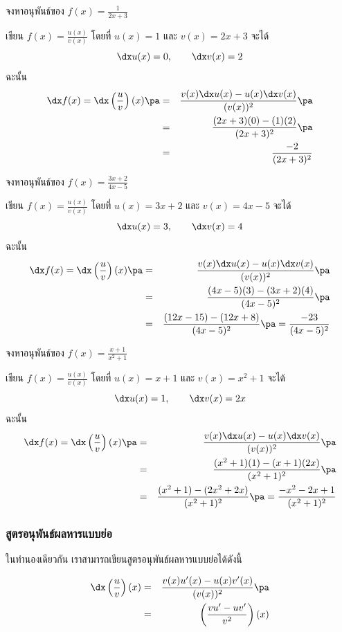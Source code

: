 \begin{frame}[t]
\begin{ex}
จงหาอนุพันธ์ของ $f(x) =\frac{1}{2x+3}$
\end{ex} \pa
\begin{sol}
เขียน $f(x) = \frac{u(x)}{v(x)}$ โดยที่ $u(x) = 1$ และ $v(x) = 2x+3$ \pa จะได้ 
\[\dx u(x) = 0, \qquad \dx v(x) = 2\] 
ฉะนั้น
\begin{eqnarray*}
\dx f(x) = \dx \left( \frac{u}{v}\right)(x) \pa &=& \frac{v(x)\dx u(x) - u(x)\dx v(x)}{(v(x))^2}\pa \\
&=& \frac{(2x+3)(0) - (1)(2)}{(2x+3)^2}\pa \\
&=& \frac{-2}{(2x+3)^2}
\end{eqnarray*}
\end{sol}
\end{frame}


\begin{frame}[t]
\begin{ex}
จงหาอนุพันธ์ของ $f(x) =\frac{3x+2}{4x-5}$
\end{ex}
\begin{sol}
เขียน $f(x) = \frac{u(x)}{v(x)}$ โดยที่ $u(x) = 3x+2$ และ $v(x) = 4x-5$ \pa จะได้ 
\[\dx u(x) = 3, \qquad \dx v(x) = 4\]
\pa ฉะนั้น
\begin{eqnarray*}
\dx f(x) = \dx \left( \frac{u}{v}\right)(x) \pa &=& \frac{v(x)\dx u(x) - u(x)\dx v(x)}{(v(x))^2}\pa \\
&=& \frac{(4x-5)(3) - (3x+2)(4)}{(4x-5)^2}\pa \\
&=& \frac{(12x-15)-(12x+8)}{(4x-5)^2} \pa = \frac{-23}{(4x-5)^2}
\end{eqnarray*}
\end{sol}
\end{frame}


\begin{frame}[t]
\begin{ex}
จงหาอนุพันธ์ของ $f(x) =\frac{x+1}{x^2+1}$
\end{ex}
\begin{sol}
เขียน $f(x) = \frac{u(x)}{v(x)}$ โดยที่ $u(x) = x+1$ และ $v(x) = x^2+1$ \pa จะได้ 
\[\dx u(x) = 1, \qquad \dx v(x) = 2x\]
\pa ฉะนั้น
\begin{eqnarray*}
\dx f(x) = \dx \left( \frac{u}{v}\right)(x) \pa &=& \frac{v(x)\dx u(x) - u(x) \dx v(x)}{(v(x))^2}\pa \\
&=& \frac{(x^2+1)(1) - (x+1)(2x)}{(x^2+1)^2}\pa \\
&=& \frac{(x^2+1) - (2x^2+2x)}{(x^2+1)^2} \pa = \frac{-x^2-2x+1}{(x^2+1)^2}
\end{eqnarray*}
\end{sol}
\end{frame}

\begin{frame}
\frametitle{สูตรอนุพันธ์ผลหารแบบย่อ}
ในทำนองเดียวกัน เราสามารถเขียนสูตรอนุพันธ์ผลหารแบบย่อได้ดังนี้
\begin{remark}{}
\begin{eqnarray*}
\dx \left(\frac{u}{v} \right)(x) &=& \frac{v(x)u'(x) - u(x)v'(x)}{(v(x))^2}\pa \\
&=& \left( \frac{vu'-uv'}{v^2}\right) (x)
\end{eqnarray*}
\end{remark}
\end{frame}
